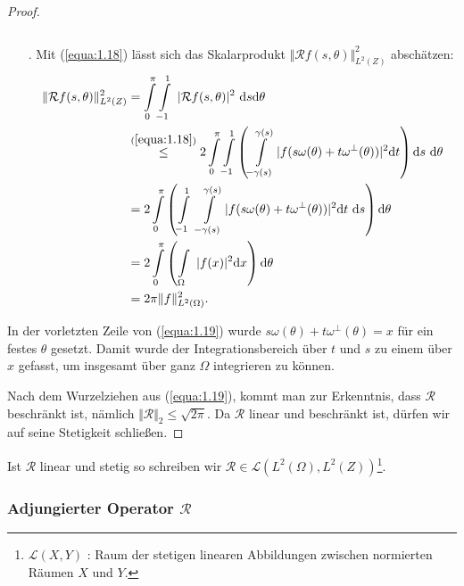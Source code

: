 \begin{proof}
\begin{enumerate}
\begin{equation}
			\label{equa:1.18}
		\end{equation}
		\item[\lowroman{2}.] Mit (\ref{equa:1.18}) lässt sich das Skalarprodukt $\Vert \mathcal{R} f(s,\theta) \Vert_{L^2(Z)}^2$ abschätzen:
		\begin{equation}
			\begin{split}
				\Vert \mathcal{R} f(s,\theta) \Vert_{L^2(Z)}^2 & = \int\limits_{0}^{\pi} \int\limits_{-1}^{1} \ |\mathcal{R} f(s,\theta)|^2 \ \mbox{d}s \mbox{d}\theta \\
				& \stackrel{(\ref{equa:1.18})}{\leq} 2 \int\limits_{0}^{\pi} \int\limits_{-1}^{1} \left( \int\limits_{-\gamma(s)}^{\gamma(s)} |f(s\omega(\theta) + t\omega^{\perp}(\theta))|^2 \mbox{d}t \right) \mbox{d}s \ \mbox{d}\theta\\
				& = 2 \int\limits_{0}^{\pi} \left( \int\limits_{-1}^{1} \ \int\limits_{-\gamma(s)}^{\gamma(s)} |f(s\omega(\theta) + t\omega^{\perp}(\theta))|^2 \mbox{d}t \ \mbox{d}s \right) \mbox{d}\theta\\
				& = 2 \int\limits_{0}^{\pi} \left( \int\limits_{\Omega} \ |f(x)|^2 \mbox{d}x \right) \mbox{d}\theta\\
				& = 2\pi \Vert f \Vert_{L^2(\Omega)}^2.
			\end{split}
			\label{equa:1.19}
		\end{equation}
	\end{enumerate}	
	In der vorletzten Zeile von (\ref{equa:1.19}) wurde $s\omega(\theta) + t\omega^{\perp}(\theta) = x$ für ein festes $\theta$ gesetzt. Damit wurde der Integrationsbereich über $t$ und $s$ zu einem über $x$ gefasst, um insgesamt über ganz $\Omega$ integrieren zu können.  
	
	Nach dem Wurzelziehen aus (\ref{equa:1.19}), kommt man zur Erkenntnis, dass $\mathcal{R}$ beschränkt ist, nämlich $\Vert \mathcal{R} \Vert_2 \leq \sqrt{2\pi}$. Da $\mathcal{R}$ linear und beschränkt ist, dürfen wir auf seine Stetigkeit schließen.	
\end{proof}
Ist $\mathcal{R}$ linear und stetig so schreiben wir $\mathcal{R} \in  \mathscr{L}(L^2(\Omega), L^2(Z))$\footnote{\label{foot:6}$\mathscr{L}(X,Y)$ : Raum der stetigen linearen Abbildungen zwischen normierten Räumen $X$ und $Y$.}.

\subsubsection{Adjungierter Operator $\mathcal{R}$}


